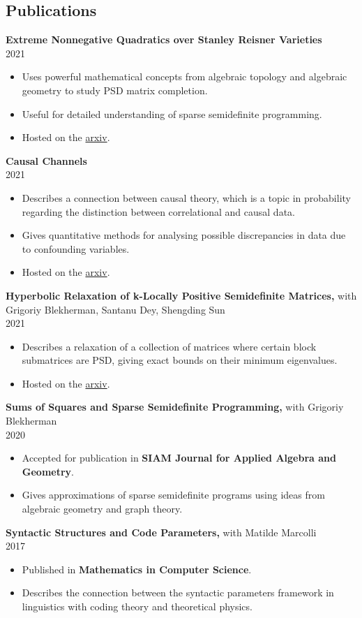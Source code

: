 \documentclass[margin]{res}
\begin{document}
\begin{resume}
\section{Publications}
{\bf    Extreme Nonnegative Quadratics over Stanley Reisner Varieties} \\ 2021
\begin{itemize} \itemsep -2pt %
\item Uses powerful mathematical concepts from algebraic topology and algebraic geometry to study PSD matrix completion.
\item Useful for detailed understanding of sparse semidefinite programming.
\item Hosted on the \href{https://arxiv.org/abs/2106.13894}{arxiv}.
\end{itemize}
{\bf    Causal Channels} \\ 2021
\begin{itemize} \itemsep -2pt %
\item Describes a connection between causal theory, which is a topic in probability regarding the distinction between correlational and causal data.
\item Gives quantitative methods for analysing possible discrepancies in data due to confounding variables.
\item Hosted on the \href{https://arxiv.org/abs/2103.02834}{arxiv}.
\end{itemize}
{\bf    Hyperbolic Relaxation of k-Locally Positive Semidefinite Matrices,} with Grigoriy Blekherman, Santanu Dey, Shengding Sun\\ 2021
\begin{itemize} \itemsep -2pt %
\item Describes a relaxation of a collection of matrices where certain block submatrices are PSD, giving exact bounds on their minimum eigenvalues.
\item Hosted on the \href{https://arxiv.org/abs/2012.04031}{arxiv}.
\end{itemize}
{\bf   Sums of Squares and Sparse Semidefinite Programming,} with Grigoriy Blekherman \\ 2020
\begin{itemize} \itemsep -2pt %
\item Accepted for publication in \textbf{SIAM Journal for Applied Algebra and Geometry}.
\item Gives approximations of sparse semidefinite programs using ideas from algebraic geometry and graph theory.
\end{itemize}
{\bf  Syntactic Structures and Code Parameters,} with Matilde Marcolli \\ 2017
\begin{itemize} \itemsep -2pt %
\item Published in \textbf{Mathematics in Computer Science}.
\item Describes the connection between the syntactic parameters framework in linguistics with coding theory and theoretical physics.
\end{itemize}



\end{resume}
\end{document}

